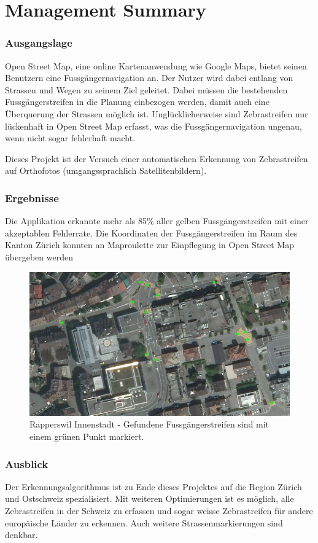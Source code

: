 \chapter*{Management Summary}
\subsection*{Ausgangslage}
Open Street Map, eine online Kartenanwendung wie Google Maps, bietet seinen Benutzern eine Fussgängernavigation an. Der Nutzer wird dabei entlang von Strassen und Wegen zu seinem Ziel geleitet. Dabei müssen die bestehenden Fussgängerstreifen in die Planung einbezogen werden, damit auch eine Überquerung der Strassen möglich ist. Unglücklicherweise sind Zebrastreifen nur lückenhaft in Open Street Map erfasst, was die Fussgängernavigation ungenau, wenn nicht sogar fehlerhaft macht.

Dieses Projekt ist der Versuch einer automatischen Erkennung von Zebrastreifen auf Orthofotos (umgangssprachlich Satellitenbildern).

\subsection*{Ergebnisse}
Die Applikation erkannte mehr als 85\% aller gelben Fussgängerstreifen mit einer akzeptablen Fehlerrate. Die Koordinaten der Fussgängerstreifen im Raum des Kanton Zürich konnten an Maproulette zur Einpflegung in Open Street Map übergeben werden
\\
\begin{figure}[H]
	\centering
	\includegraphics[width=\textwidth -10mm]{images/boxsave_rappi.png}
	\caption[Überblick]{Rapperswil Innenstadt - Gefundene Fussgängerstreifen sind mit einem grünen Punkt markiert.}
\end{figure}
\subsection*{Ausblick}
Der Erkennungsalgorithmus ist zu Ende dieses Projektes auf die Region Zürich und Ostschweiz spezialisiert. Mit weiteren Optimierungen ist es möglich, alle Zebrastreifen in der Schweiz zu erfassen und sogar weisse Zebrastreifen für andere europäische Länder zu erkennen. Auch weitere Strassenmarkierungen sind denkbar.